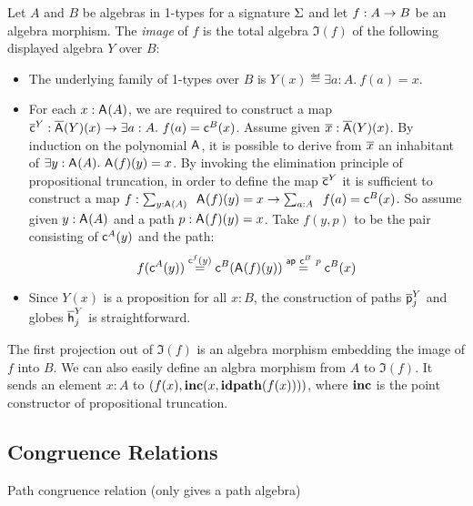 \begin{definition}
Let $A$ and $B$ be algebras in 1-types for a signature $\Sigma$ and let
$f : A \rightarrow B$ be an algebra morphism. The \emph{image} of $f$ is
the total algebra $\Im(f)$ of the following displayed algebra $Y$ over $B$:
\begin{itemize}
\item The underlying family of 1-types over $B$ is $Y(x) \eqdef \exists a : A.\ f(a) = x$.
\item For each $x : \mathsf{A}^{}(A)$, we are required to construct
a map $\overline{\mathsf{c}}^{Y} : \overline{\mathsf{A}^{}}(Y)(x) \rightarrow
\exists a : A.\ f(a) = \mathsf{c}^{B}(x)$. Assume given $\overline{x}
: \overline{\mathsf{A}^{}}(Y)(x)$. By induction on the polynomial
$\mathsf{A}^{}$, it is possible to derive from $\overline{x}$ an
inhabitant of $\exists y
: \mathsf{A}^{}(A).\ \mathsf{A}^{}(f)(y) = x$. By
invoking the elimination principle of propositional truncation, in
order to define the map $\overline{\mathsf{c}}^{Y}$ it is sufficient to
construct a map $f : \Sum {y
: \polyAct{\pointconstr}{A}}.\ \polyAct{\pointconstr}{f}(y) =
x \rightarrow \Sum {a : A}.\ f(a) = \AlgPoint{B}(x)$.  So assume given
$y : \mathsf{A}^{}(A)$ and a path $p
: \mathsf{A}^{}(f)(y) = x$. Take $f(y,p)$ to be the pair
consisting of $\mathsf{c}^{A}(y)$ and the path:
\[
f(\mathsf{c}^{A}(y))
\stackrel{\mathsf{c}^{f}(y)}{=}
\mathsf{c}^{B}(\mathsf{A}^{}(f)(y))
\stackrel{\mathsf{ap} \ \mathsf{c}^{B} \ p}{=}
\mathsf{c}^{B}(x)
\]
\item Since $Y(x)$ is a proposition for all $x : B$, the construction of
paths $\overline{\mathsf{p}}^{Y}_{j}$ and globes $\overline{\mathsf{h}}^{Y}_{j}$ is
straightforward.
\end{itemize}

The first projection out of $\Im(f)$ is an algebra morphism embedding
the image of $f$ into $B$. We can also easily define an algbra
morphism from $A$ to $\Im(f)$. It sends an element $x : A$ to
$(f(x),\operatorname{\mathbf{inc}}(x,\operatorname{\mathbf{idpath}}(f(x))))$, where $\operatorname{\mathbf{inc}}$ is the point constructor of
propositional truncation. 
\end{definition}



\subsection{Congruence Relations}

\begin{definition}
Path congruence relation (only gives a path algebra)
\end{definition}

